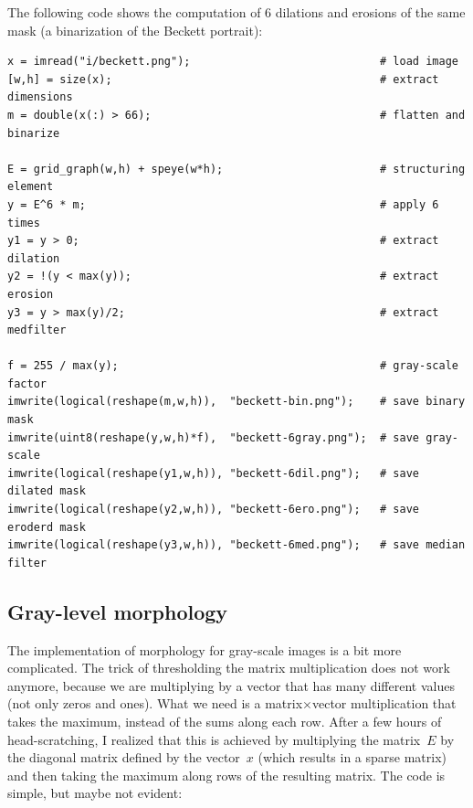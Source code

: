 The following code shows the computation of 6 dilations and erosions of the
same mask (a binarization of the Beckett portrait):

\begin{verbatim}
x = imread("i/beckett.png");                             # load image
[w,h] = size(x);                                         # extract dimensions
m = double(x(:) > 66);                                   # flatten and binarize

E = grid_graph(w,h) + speye(w*h);                        # structuring element
y = E^6 * m;                                             # apply 6 times
y1 = y > 0;                                              # extract dilation
y2 = !(y < max(y));                                      # extract erosion
y3 = y > max(y)/2;                                       # extract medfilter

f = 255 / max(y);                                        # gray-scale factor
imwrite(logical(reshape(m,w,h)),  "beckett-bin.png");    # save binary mask
imwrite(uint8(reshape(y,w,h)*f),  "beckett-6gray.png");  # save gray-scale
imwrite(logical(reshape(y1,w,h)), "beckett-6dil.png");   # save dilated mask
imwrite(logical(reshape(y2,w,h)), "beckett-6ero.png");   # save eroderd mask
imwrite(logical(reshape(y3,w,h)), "beckett-6med.png");   # save median filter
\end{verbatim}

\begin{gallery}
\end{gallery}

\subsection{Gray-level morphology}


The implementation of morphology for gray-scale images is a bit more
complicated.  The trick of thresholding the matrix multiplication does not
work anymore, because we are multiplying by a vector that has many different
values (not only zeros and ones).  What we need is a matrix$\times$vector
multiplication that takes the maximum, instead of the sums along each row.
After a few hours of head-scratching, I realized that this is achieved by
multiplying the matrix~$E$ by the diagonal matrix defined by the vector~$x$
(which results in a sparse matrix) and then taking the maximum along rows of
the resulting matrix.  The code is simple, but maybe not evident:

